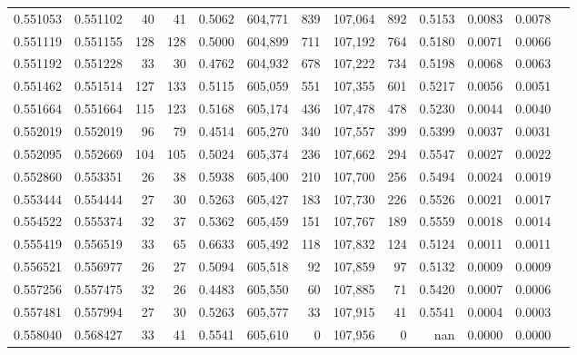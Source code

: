 \begin{tabular}{rrrrrrrrrrrrr}
0.551053 & 0.551102 &    40 &    41 &                                     0.5062 & 604,771 &     839 & 107,064 &     892 & 0.5153 & 0.0083 & 0.0078 \\
0.551119 & 0.551155 &   128 &   128 &                                     0.5000 & 604,899 &     711 & 107,192 &     764 & 0.5180 & 0.0071 & 0.0066 \\
0.551192 & 0.551228 &    33 &    30 &                                     0.4762 & 604,932 &     678 & 107,222 &     734 & 0.5198 & 0.0068 & 0.0063 \\
0.551462 & 0.551514 &   127 &   133 &                                     0.5115 & 605,059 &     551 & 107,355 &     601 & 0.5217 & 0.0056 & 0.0051 \\
0.551664 & 0.551664 &   115 &   123 &                                     0.5168 & 605,174 &     436 & 107,478 &     478 & 0.5230 & 0.0044 & 0.0040 \\
0.552019 & 0.552019 &    96 &    79 &                                     0.4514 & 605,270 &     340 & 107,557 &     399 & 0.5399 & 0.0037 & 0.0031 \\
0.552095 & 0.552669 &   104 &   105 &                                     0.5024 & 605,374 &     236 & 107,662 &     294 & 0.5547 & 0.0027 & 0.0022 \\
0.552860 & 0.553351 &    26 &    38 &                                     0.5938 & 605,400 &     210 & 107,700 &     256 & 0.5494 & 0.0024 & 0.0019 \\
0.553444 & 0.554444 &    27 &    30 &                                     0.5263 & 605,427 &     183 & 107,730 &     226 & 0.5526 & 0.0021 & 0.0017 \\
0.554522 & 0.555374 &    32 &    37 &                                     0.5362 & 605,459 &     151 & 107,767 &     189 & 0.5559 & 0.0018 & 0.0014 \\
0.555419 & 0.556519 &    33 &    65 &                                     0.6633 & 605,492 &     118 & 107,832 &     124 & 0.5124 & 0.0011 & 0.0011 \\
0.556521 & 0.556977 &    26 &    27 &                                     0.5094 & 605,518 &      92 & 107,859 &      97 & 0.5132 & 0.0009 & 0.0009 \\
0.557256 & 0.557475 &    32 &    26 &                                     0.4483 & 605,550 &      60 & 107,885 &      71 & 0.5420 & 0.0007 & 0.0006 \\
0.557481 & 0.557994 &    27 &    30 &                                     0.5263 & 605,577 &      33 & 107,915 &      41 & 0.5541 & 0.0004 & 0.0003 \\
0.558040 & 0.568427 &    33 &    41 &                                     0.5541 & 605,610 &       0 & 107,956 &       0 &    nan & 0.0000 & 0.0000 \\
\bottomrule
\end{tabular}
